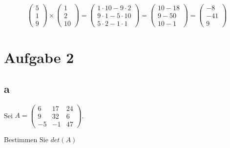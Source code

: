\begin{align*}
    \begin{pmatrix}
        5 \\ 1 \\ 9
    \end{pmatrix} \times \begin{pmatrix}
                             1 \\ 2 \\ 10
                         \end{pmatrix} = \begin{pmatrix}
                                             1 \cdot 10 - 9 \cdot 2 \\
                                             9 \cdot 1 - 5 \cdot 10 \\
                                             5 \cdot 2 - 1 \cdot 1
                                         \end{pmatrix} = \begin{pmatrix}
                                                             10 - 18 \\
                                                             9 - 50  \\
                                                             10 - 1
                                                         \end{pmatrix} = \begin{pmatrix}
                                                                             -8 \\ -41 \\ 9
                                                                         \end{pmatrix}
\end{align*}

\section{Aufgabe 2}

\subsection{a}
Sei $A = \begin{pmatrix}6 & 17 & 24 \\ 9 & 32 & 6 \\ -5 & -1 & 47\end{pmatrix}$.

Bestimmen Sie $det(A)$

